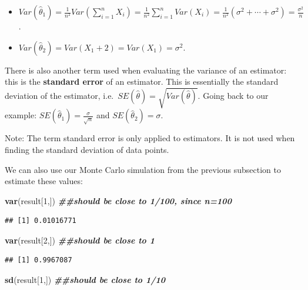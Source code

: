 \documentclass[
]{book}
\newenvironment{Shaded}{\begin{snugshade}}{\end{snugshade}}
\newcommand{\DecValTok}[1]{\textcolor[rgb]{0.00,0.00,0.81}{#1}}
\newcommand{\DocumentationTok}[1]{\textcolor[rgb]{0.56,0.35,0.01}{\textbf{\textit{#1}}}}
\newcommand{\FunctionTok}[1]{\textcolor[rgb]{0.13,0.29,0.53}{\textbf{#1}}}
\newcommand{\NormalTok}[1]{#1}
\theoremstyle{definition}
\theoremstyle{definition}
\theoremstyle{definition}
\theoremstyle{definition}
\theoremstyle{remark}
\begin{document}
\begin{itemize}
\item
  \(Var(\hat{\theta}_1) = \frac{1}{n^2}Var(\sum_{i=1}^n X_i) = \frac{1}{n^2} \sum_{i=1}^n Var(X_i) = \frac{1}{n^2} (\sigma^2 + \cdots + \sigma^2) = \frac{\sigma^2}{n}\).
\item
  \(Var(\hat{\theta}_2) = Var(X_1 + 2) = Var(X_1) = \sigma^2\).
\end{itemize}

There is also another term used when evaluating the variance of an estimator: this is the \textbf{standard error} of an estimator. This is essentially the standard deviation of the estimator, i.e.~\(SE(\hat{\theta}) = \sqrt{Var(\hat{\theta})}\). Going back to our example: \(SE(\hat{\theta}_1) = \frac{\sigma}{\sqrt{n}}\) and \(SE(\hat{\theta}_2) = \sigma\).

Note: The term standard error is only applied to estimators. It is not used when finding the standard deviation of data points.

We can also use our Monte Carlo simulation from the previous subsection to estimate these values:

\begin{Shaded}
\begin{Highlighting}[]
\FunctionTok{var}\NormalTok{(result[}\DecValTok{1}\NormalTok{,]) }\DocumentationTok{\#\#should be close to 1/100, since n=100}
\end{Highlighting}
\end{Shaded}

\begin{verbatim}
## [1] 0.01016771
\end{verbatim}

\begin{Shaded}
\begin{Highlighting}[]
\FunctionTok{var}\NormalTok{(result[}\DecValTok{2}\NormalTok{,]) }\DocumentationTok{\#\#should be close to 1}
\end{Highlighting}
\end{Shaded}

\begin{verbatim}
## [1] 0.9967087
\end{verbatim}

\begin{Shaded}
\begin{Highlighting}[]
\FunctionTok{sd}\NormalTok{(result[}\DecValTok{1}\NormalTok{,]) }\DocumentationTok{\#\#should be close to 1/10}
\end{Highlighting}
\end{Shaded}
\end{document}
